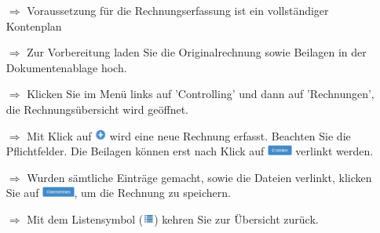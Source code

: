 \documentclass{article}
\begin{document}
\begin{multicols}{2}
\begin{tcolorbox}[colback=blue!5,colframe=blue!40!black,title=Eine Rechnung erfassen]
\begin{itemize}
  \item[$\Longrightarrow$] Voraussetzung für die Rechnungserfassung ist ein vollständiger Kontenplan
	\item[$\Longrightarrow$] Zur Vorbereitung laden Sie die Originalrechnung sowie Beilagen in der Dokumentenablage hoch.
  \item[$\Longrightarrow$] Klicken Sie im Menü links auf 'Controlling' und dann auf 'Rechnungen', die Rechnungsübersicht wird geöffnet.
  \item[$\Longrightarrow$] Mit Klick auf \includegraphics[height=10pt]{Icons/Plussymbol.jpg} wird eine neue Rechnung erfasst. Beachten Sie die Pflichtfelder. Die Beilagen können erst nach Klick auf \includegraphics[height=10pt]{Icons/B_Erstellen.jpg} verlinkt werden.
  \item[$\Longrightarrow$] Wurden sämtliche Einträge gemacht, sowie die Dateien verlinkt, klicken Sie auf \includegraphics[height=10pt]{Icons/B_Uebernehmen.jpg}, um die Rechnung  zu speichern.
	\item[$\Longrightarrow$] Mit dem Listensymbol (\includegraphics[height=10pt]{Icons/Listensymbol_zurueck.jpg}) kehren Sie zur Übersicht zurück.
\end{itemize}
\end{tcolorbox}


\end{multicols}

\end{document}

